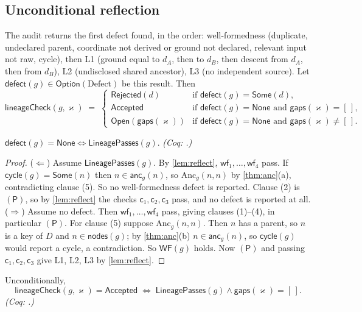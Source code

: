 \subsection{Unconditional reflection}
The audit returns the first defect found, in the order: well-formedness (duplicate, undeclared parent, coordinate not derived or ground not declared, relevant input not raw, cycle), then L1 (ground equal to $d_A$, then to $d_B$, then descent from $d_A$, then from $d_B$), L2 (undisclosed shared ancestor), L3 (no independent source). Let $\mathsf{defect}(g) \in \mathsf{Option}(\text{Defect})$ be this result. Then
\[
\mathsf{lineageCheck}(g,\varkappa) \;=\;
\begin{cases}
\mathsf{Rejected}(d) & \text{if } \mathsf{defect}(g) = \mathsf{Some}(d),\\
\mathsf{Accepted} & \text{if } \mathsf{defect}(g) = \mathsf{None} \text{ and } \mathsf{gaps}(\varkappa) = [\,],\\
\mathsf{Open}(\mathsf{gaps}(\varkappa)) & \text{if } \mathsf{defect}(g) = \mathsf{None} \text{ and } \mathsf{gaps}(\varkappa) \neq [\,].
\end{cases}
\]
\begin{lem}\label{lem:defectnone}
$\mathsf{defect}(g) = \mathsf{None} \Longleftrightarrow \mathsf{LineagePasses}(g)$. \emph{(Coq: .)}
\end{lem}
\begin{proof}
($\Leftarrow$) Assume $\mathsf{LineagePasses}(g)$. By \cref{lem:reflect}, $\mathsf{wf}_1,\dots,\mathsf{wf}_4$ pass. If $\mathsf{cycle}(g) = \mathsf{Some}(n)$ then $n \in \mathsf{anc}_g(n)$, so $\mathrm{Anc}_g(n,n)$ by \cref{thm:anc}(a), contradicting clause (5). So no well-formedness defect is reported. Clause (2) is $(\mathsf{P})$, so by \cref{lem:reflect} the checks $\mathsf{c}_1,\mathsf{c}_2,\mathsf{c}_3$ pass, and no defect is reported at all.
($\Rightarrow$) Assume no defect. Then $\mathsf{wf}_1,\dots,\mathsf{wf}_4$ pass, giving clauses (1)--(4), in particular $(\mathsf{P})$. For clause (5) suppose $\mathrm{Anc}_g(n,n)$. Then $n$ has a parent, so $n$ is a key of $D$ and $n \in \mathsf{nodes}(g)$; by \cref{thm:anc}(b) $n \in \mathsf{anc}_g(n)$, so $\mathsf{cycle}(g)$ would report a cycle, a contradiction. So $\mathsf{WF}(g)$ holds. Now $(\mathsf{P})$ and passing $\mathsf{c}_1,\mathsf{c}_2,\mathsf{c}_3$ give L1, L2, L3 by \cref{lem:reflect}.
\end{proof}
\begin{thm}\label{thm:reflect}
Unconditionally,
\[
\mathsf{lineageCheck}(g,\varkappa) = \mathsf{Accepted} \;\Longleftrightarrow\; \mathsf{LineagePasses}(g) \wedge \mathsf{gaps}(\varkappa) = [\,].
\]
\emph{(Coq: .)}
\end{thm}
